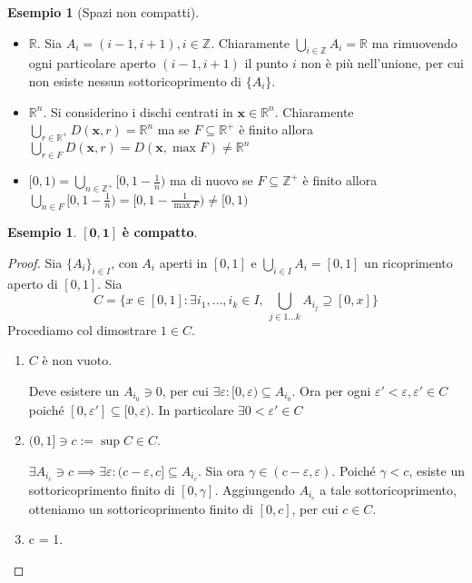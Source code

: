 \documentclass{article}
\newcounter{theo}[section]\setcounter{theo}{0}
\newcounter{excounter}[section]\setcounter{excounter}{0}
\theoremstyle{plain}
\theoremstyle{definition}
\newtheorem{example}[excounter]{Esempio}
\theoremstyle{remark}
\begin{document}
\begin{example}[Spazi non compatti] \(\) 
\begin{itemize}[label = --]
    \item \(\mathbb{R}\). Sia \(A_{i} = (i - 1, i + 1), i \in \mathbb{Z}\).
        Chiaramente \(\bigcup_{i \in  \mathbb{Z}} A_{i} = \mathbb{R}\) ma
        rimuovendo ogni particolare aperto \((i - 1, i + 1)\) il punto \(i\) non
        è più nell'unione, per cui non esiste nessun sottoricoprimento di
        \(\{A_{i}\} \).
    \item \(\mathbb{R}^{n}\). Si considerino i dischi centrati in \(\mathbf{x} \in
        \mathbb{R}^{n}\). Chiaramente \(\bigcup_{r \in
        \mathbb{R}^{+}}D(\mathbf{x}, r) = \mathbb{R}^{n} \) ma se \(F \subseteq
        \mathbb{R}^{+}\) è finito allora \(\bigcup_{r \in F} D(\mathbf{x}, r) =
        D(\mathbf{x}, \max F) \neq \mathbb{R}^{n}\) 
    \item \([0, 1) = \bigcup_{n \in \mathbb{Z}^{+}}[0, 1 - \frac{1}{n})\) ma di
        nuovo se \(F \subseteq \mathbb{Z}^{+} \) è finito allora \(\bigcup_{n
        \in F} [0, 1 - \frac{1}{n}) = [0, 1 - \frac{1}{\max F}) \neq [0, 1)\) 
\end{itemize}
\begin{example} \(\mathbf{[0, 1]}\) \textbf{è compatto}.
\end{example}
\begin{proof}
    Sia \(\{A_{i}\}_{i \in  I}\), con \(A_{i}\) aperti in \([0, 1]\) e
    \(\bigcup_{i \in  I} A_{i} = [0, 1]\) un ricoprimento aperto di \([0, 1]\).
    Sia \[C = \{x \in [0, 1] : \exists i_{1}, \dots, i_k \in I, \, \bigcup_{j
    \in 1\dots k} A_{i_j} \supseteq [0, x] \} \]
    Procediamo col dimostrare \(1 \in C\).
\begin{enumerate}[label = \alph*.]
    \item \(C\) è non vuoto.

        Deve esistere un \(A_{i_0} \ni 0\), per cui
        \(\exists \varepsilon : [0, \varepsilon) \subseteq A_{i_0}\). Ora per
        ogni \(\varepsilon' < \varepsilon, \varepsilon' \in C\) poiché \([0,
        \varepsilon'] \subseteq [0, \varepsilon) \). In particolare \(\exists 0
        < \varepsilon'\in C\) 
    \item \((0, 1] \ni c := \sup C \in C\).

        \(\exists A_{i_c} \ni c \implies \exists \varepsilon : (c - \varepsilon,
        c] \subseteq A_{i_c} \). Sia ora \(\gamma \in (c - \varepsilon,
        \varepsilon)\). Poiché \(\gamma < c\), esiste un sottoricoprimento
        finito di \([0, \gamma]\). Aggiungendo \(A_{i_c}\) a tale
        sottoricoprimento, otteniamo un sottoricoprimento finito di \([0, c]\),
        per cui \(c \in C\). 
    \item c = 1.


\end{enumerate}
\end{proof}
\end{example}
\end{document}
